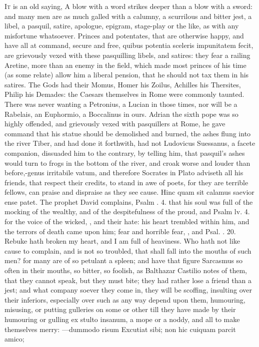{\lettrine{I}{t} is an old saying, A blow with a word strikes deeper than a
blow with a sword: and many men are as much galled with a calumny, a
scurrilous and bitter jest, a libel, a pasquil, satire, apologue,
epigram, stage-play or the like, as with any misfortune whatsoever.
Princes and potentates, that are otherwise happy, and have all at
command, secure and free, quibus potentia sceleris impunitatem fecit,
are grievously vexed with these pasquilling libels, and satires: they
fear a railing Aretine, more than an enemy in the field, which
made most princes of his time (as some relate) allow him a liberal
pension, that he should not tax them in his satires. The Gods had
their Momus, Homer his Zoilus, Achilles his Thersites, Philip his
Demades: the Caesars themselves in Rome were commonly taunted. There
was never wanting a Petronius, a Lucian in those times, nor will be a
Rabelais, an Euphormio, a Boccalinus in ours. Adrian the sixth pope
was so highly offended, and grievously vexed with pasquillers at
Rome, he gave command that his statue should be demolished and burned,
the ashes flung into the river Tiber, and had done it forthwith, had
not Ludovicus Suessanus, a facete companion, dissuaded him to the
contrary, by telling him, that pasquil's ashes would turn to frogs in
the bottom of the river, and croak worse and louder than before,-genus
irritabile vatum, and therefore Socrates in Plato adviseth all
his friends, that respect their credits, to stand in awe of poets, for
they are terrible fellows, can praise and dispraise as they see cause.
Hinc quam sit calamus saevior ense patet. The prophet David complains,
Psalm . 4. that his soul was full of the mocking of the wealthy,
and of the despitefulness of the proud, and Psalm lv. 4. for the voice
of the wicked, \etc{}, and their hate: his heart trembled within him, and
the terrors of death came upon him; fear and horrible fear, \etc{}, and
Psal. . 20. Rebuke hath broken my heart, and I am full of
heaviness. Who hath not like cause to complain, and is not so troubled,
that shall fall into the mouths of such men? for many are of so
petulant a spleen; and have that figure Sarcasmus so often in
their mouths, so bitter, so foolish, as Balthazar Castilio notes
of them, that they cannot speak, but they must bite; they had rather
lose a friend than a jest; and what company soever they come in, they
will be scoffing, insulting over their inferiors, especially over such
as any way depend upon them, humouring, misusing, or putting gulleries
on some or other till they have made by their humouring or gulling
ex stulto insanum, a mope or a noddy, and all to make themselves
merry:
---dummodo risum
Excutiat sibi; non hic cuiquam parcit amico;

}
